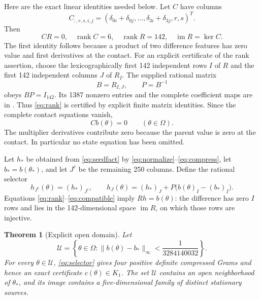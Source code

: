\documentclass[11pt]{article}
\newtheorem{theorem}{Theorem}
\begin{document}
Here are the exact linear identities needed below.  Let $C$ have columns
\begin{equation}
 C_{:,r,s,i,j}=
  (\delta_{0i}+\delta_{0j},\ldots,
        \delta_{3i}+\delta_{3j},r,s)^T.
 \label{eq:C}
\end{equation}
Then
\begin{equation}
 CR=0,\quad \operatorname{rank}C=6,\quad
 \operatorname{rank}R=142,\quad \operatorname{im}R=\ker C.
 \label{eq:rank}
\end{equation}
The first identity follows because a product of two difference features
has zero value and first derivatives at the contact.  For an explicit
certificate of the rank assertion, choose the lexicographically first
142 independent rows $I$ of $R$ and the first 142 independent columns
$J$ of $R_I$.  The supplied rational matrix
\begin{equation}
 B=R_{I,J},\qquad P=B^{-1}
 \label{eq:inverse}
\end{equation}
obeys $BP=I_{142}$.  Its 1387 nonzero entries and the complete coefficient
maps are in
.
Thus \eqref{eq:rank} is certified by explicit finite matrix identities.
Since the complete contact equations vanish,
\begin{equation}
 Cb(\theta)=0\qquad(\theta\in\Omega).
 \label{eq:compatible}
\end{equation}
The multiplier derivatives contribute zero because the parent value is
zero at the contact.  In particular no state equation has been omitted.

Let $h_*$ be obtained from \eqref{eq:seedfact} by
\eqref{eq:normalize}--\eqref{eq:compress}, let $b_*=b(\theta_*)$, and
let $J^c$ be the remaining 250 columns.  Define the rational selector
\begin{equation}
 h_{J^c}(\theta)=(h_*)_{J^c},\qquad
 h_J(\theta)=(h_*)_J+P\bigl(b(\theta)_I-(b_*)_I\bigr).
 \label{eq:selector}
\end{equation}
Equations \eqref{eq:rank}--\eqref{eq:compatible} imply $Rh=b(\theta)$:
the difference has zero $I$ rows and lies in the 142-dimensional space
$\operatorname{im}R$, on which those rows are injective.

\begin{theorem}[Explicit open domain]
Let
\begin{equation}
 \mathcal U=\left\{\theta\in\Omega:
       \|b(\theta)-b_*\|_\infty<\frac1{3284140032}\right\}.
 \label{eq:U}
\end{equation}
For every $\theta\in\mathcal U$, \eqref{eq:selector} gives four positive
definite compressed Grams and hence an exact certificate
$c(\theta)\in K_1$.  The set $\mathcal U$ contains an open neighborhood
of $\theta_*$, and its image contains a five-dimensional family of
distinct stationary sources.
\end{theorem}
\end{document}
